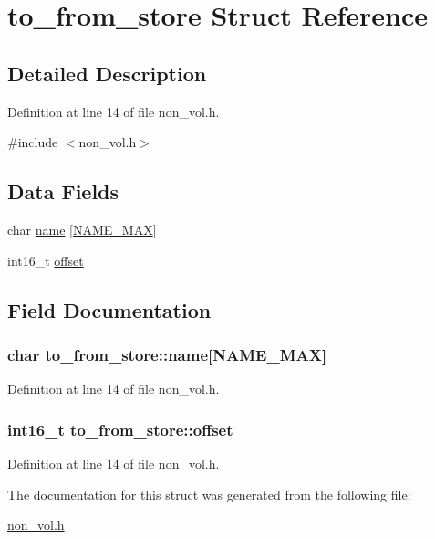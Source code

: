 \hypertarget{structto__from__store}{\section{to\-\_\-from\-\_\-store Struct Reference}
\label{structto__from__store}
}


\subsection{Detailed Description}


Definition at line 14 of file non\-\_\-vol.\-h.



{\ttfamily \#include $<$non\-\_\-vol.\-h$>$}

\subsection*{Data Fields}
\begin{DoxyCompactItemize}
\item 
char \hyperlink{structto__from__store_ad71d16bfd9efc4a31db25fa8a1487e2e}{name} \mbox{[}\hyperlink{data__legnths_8h_ac64541bdd81c961304b9babef1402640}{N\-A\-M\-E\-\_\-\-M\-A\-X}\mbox{]}
\item 
int16\-\_\-t \hyperlink{structto__from__store_af12e48f8f0b20089544f2693de03640e}{offset}
\end{DoxyCompactItemize}


\subsection{Field Documentation}
\hypertarget{structto__from__store_ad71d16bfd9efc4a31db25fa8a1487e2e}{
\subsubsection[{name}]{\setlength{\rightskip}{0pt plus 5cm}char to\-\_\-from\-\_\-store\-::name\mbox{[}{\bf N\-A\-M\-E\-\_\-\-M\-A\-X}\mbox{]}}}\label{structto__from__store_ad71d16bfd9efc4a31db25fa8a1487e2e}


Definition at line 14 of file non\-\_\-vol.\-h.

\hypertarget{structto__from__store_af12e48f8f0b20089544f2693de03640e}{
\subsubsection[{offset}]{\setlength{\rightskip}{0pt plus 5cm}int16\-\_\-t to\-\_\-from\-\_\-store\-::offset}}\label{structto__from__store_af12e48f8f0b20089544f2693de03640e}


Definition at line 14 of file non\-\_\-vol.\-h.



The documentation for this struct was generated from the following file\-:\begin{DoxyCompactItemize}
\item 
\hyperlink{non__vol_8h}{non\-\_\-vol.\-h}\end{DoxyCompactItemize}
